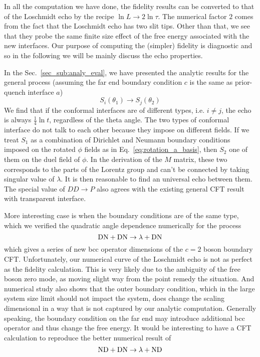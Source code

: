 

In all the computation we have done, the fidelity results can be converted to that of the Loschmidt echo by the recipe $ \ln L \rightarrow 2 \ln \tau$. The numerical factor $2$ comes from the fact that the Loschmidt echo has two slit tips. Other than that, we see that they probe the same finite size effect of the free energy associated with the new interfaces. Our purpose of computing the (simpler) fidelity is diagnostic and so in the following we will be mainly discuss the echo properties. 

In the Sec.~\ref{sec_sub:analy_eval}, we have presented the analytic results for the general process (assuming the far end boundary condition $c$ is the same as prior-quench interface $a$) 
\begin{equation}
 S_i( \theta_1 ) \rightarrow S_j( \theta_2 )
\end{equation}
We find that if the conformal interfaces are of different types, i.e. $i \ne j$, the echo is always $\frac{1}{4} \ln t$, regardless of the theta angle. The two types of conformal interface do not talk to each other because they impose on different fields. If we treat $S_1$ as a combination of Dirichlet and Neumann boundary conditions imposed on the rotated $\phi$ fields as in Eq.~\eqref{eq:rotation_a_basis}, then $S_2$ one of them on the duel field of $\phi$. In the derivation of the $M$ matrix, these two corresponds to the parts of the Lorentz group and can't be connected by taking singular value of $\lambda$. It is then reasonable to find an universal echo between them. The special value of $DD \rightarrow P$ also agrees with the existing general CFT result with transparent interface\cite{stephan_logarithmic_2013,stephan_local_2011,vasseur_universal_2014,vasseur_crossover_2013,kennes_universal_2014}. 


More interesting case is when the boundary conditions are of the same type, which we verified the quadratic angle dependence numerically for the process 
\begin{equation}
{\rm DN} + {\rm DN} \rightarrow \lambda + {\rm DN} 
\end{equation}
which gives a series of new bcc operator dimensions of the $c = 2$ boson boundary CFT. Unfortunately, our numerical curve of the Loschmidt echo is not as perfect as the fidelity calculation. This is very likely due to the ambiguity of the free boson zero mode, as moving slight way from the point remedy the situation. And numerical study also shows that the outer boundary condition, which in the large system size limit should not impact the system, does change the scaling dimensional in a way that is not captured by our analytic computation. Generally speaking, the boundary condition on the far end may introduce additional bcc operator and thus change the free energy. It would be interesting to have a CFT calculation to reproduce the better numerical result of
\begin{equation}
{\rm ND} + {\rm DN} \rightarrow \lambda + {\rm ND} 
\end{equation}


